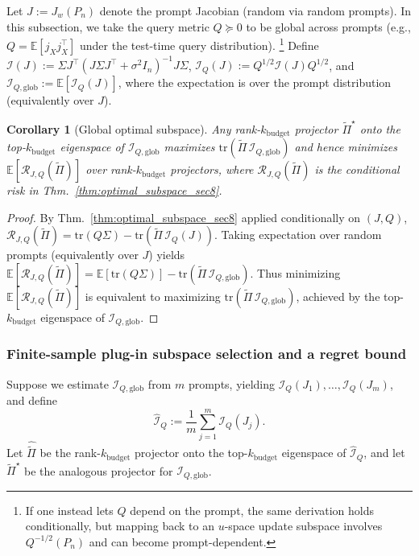 \documentclass{article}
\theoremstyle{plain}
\newtheorem{corollary}[theorem]{Corollary}
\theoremstyle{definition}
\theoremstyle{remark}
\begin{document}
Let $J:=J_w(P_n)$ denote the prompt Jacobian (random via random prompts). In this subsection, we take the query metric $Q\succeq 0$ to be global across prompts (e.g., $Q=\mathbb E[j_X j_X^\top]$ under the test-time query distribution). \footnote{If one instead lets $Q$ depend on the prompt, the same derivation holds conditionally, but mapping back to an $u$-space update subspace involves $Q^{-1/2}(P_n)$ and can become prompt-dependent.} Define $\mathcal I(J):=\Sigma J^\top(J\Sigma J^\top+\sigma^2 I_n)^{-1}J\Sigma$, $\mathcal I_Q(J):=Q^{1/2}\mathcal I(J)Q^{1/2}$, and $\mathcal I_{Q,\mathrm{glob}}:=\mathbb E[\mathcal I_Q(J)]$, where the expectation is over the prompt distribution (equivalently over $J$).

\begin{corollary}[Global optimal subspace]
\label{cor:global_optimal_subspace_app}
Any rank-$k_{\text{budget}}$ projector $\widetilde\Pi^\star$ onto the top-$k_{\text{budget}}$ eigenspace of
$\mathcal I_{Q,\mathrm{glob}}$ maximizes $\mathrm{tr}(\widetilde\Pi\,\mathcal I_{Q,\mathrm{glob}})$ and hence minimizes
$\mathbb E[\mathcal R_{J,Q}(\widetilde\Pi)]$ over rank-$k_{\text{budget}}$ projectors, where
$\mathcal R_{J,Q}(\widetilde\Pi)$ is the conditional risk in Thm.~\ref{thm:optimal_subspace_sec8}.
\end{corollary}

\begin{proof}
By Thm.~\ref{thm:optimal_subspace_sec8} applied conditionally on $(J,Q)$,
$\mathcal R_{J,Q}(\widetilde\Pi)=\mathrm{tr}(Q\Sigma)-\mathrm{tr}(\widetilde\Pi\,\mathcal I_Q(J))$.
Taking expectation over random prompts (equivalently over $J$) yields
$\mathbb E[\mathcal R_{J,Q}(\widetilde\Pi)]=\mathbb E[\mathrm{tr}(Q\Sigma)]-\mathrm{tr}(\widetilde\Pi\,\mathcal I_{Q,\mathrm{glob}})$.
Thus minimizing $\mathbb E[\mathcal R_{J,Q}(\widetilde\Pi)]$ is equivalent to maximizing
$\mathrm{tr}(\widetilde\Pi\,\mathcal I_{Q,\mathrm{glob}})$, achieved by the top-$k_{\text{budget}}$ eigenspace of
$\mathcal I_{Q,\mathrm{glob}}$.
\end{proof}

\subsubsection{Finite-sample plug-in subspace selection and a regret bound}
\label{app:finite_sample_subspace}

Suppose we estimate $\mathcal I_{Q,\mathrm{glob}}$ from $m$ prompts, yielding $\mathcal I_Q(J_1),\dots,\mathcal I_Q(J_m)$, and define
\[
\widehat{\mathcal I}_Q:=\frac{1}{m}\sum_{j=1}^m \mathcal I_Q(J_j).
\]
Let $\widehat{\widetilde\Pi}$ be the rank-$k_{\text{budget}}$ projector onto the top-$k_{\text{budget}}$ eigenspace of
$\widehat{\mathcal I}_Q$, and let $\widetilde\Pi^\star$ be the analogous projector for $\mathcal I_{Q,\mathrm{glob}}$.
\end{document}
